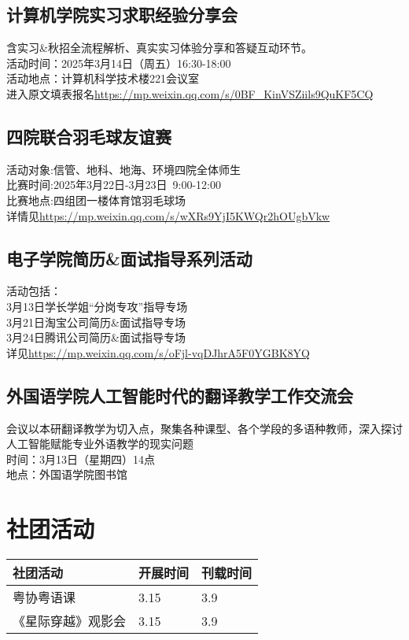 \documentclass[letterpaper, 12pt]{article}
\begin{document}
\begin{multicols}{2}
\subsection{计算机学院实习求职经验分享会}
含实习\&秋招全流程解析、真实实习体验分享和答疑互动环节。\\
活动时间：2025年3月14日（周五）16:30-18:00\\
活动地点：计算机科学技术楼221会议室\\
进入原文填表报名\url{https://mp.weixin.qq.com/s/0BF_KinVSZiils9QuKF5CQ}\\

\subsection{四院联合羽毛球友谊赛}
活动对象:信管、地科、地海、环境四院全体师生\\
比赛时间:2025年3月22日-3月23日 9:00-12:00\\
比赛地点:四组团一楼体育馆羽毛球场\\
详情见\url{https://mp.weixin.qq.com/s/wXRs9YjI5KWQr2hOUgbVkw}
\subsection{电子学院简历\&面试指导系列活动}
活动包括：\\
3月13日学长学姐“分岗专攻”指导专场\\
3月21日淘宝公司简历\&面试指导专场\\
3月24日腾讯公司简历\&面试指导专场\\
详见\url{https://mp.weixin.qq.com/s/oFjl-vqDJhrA5F0YGBK8YQ}
\subsection{外国语学院人工智能时代的翻译教学工作交流会}
会议以本研翻译教学为切入点，聚集各种课型、各个学段的多语种教师，深入探讨人工智能赋能专业外语教学的现实问题\\
时间：3月13日（星期四）14点\\
地点：外国语学院图书馆\\




\section{社团活动}
\begin{tabular}{|>{\centering\arraybackslash}m{}|m{}|m{}|}
    \hline
    社团活动 & 开展时间 & 刊载时间\\
    \hline\hline
    粤协粤语课 & 3.15 & 3.9\\
    《星际穿越》观影会 & 3.15 & 3.9\\
    \hline
\end{tabular}
\end{multicols}
\end{document}
